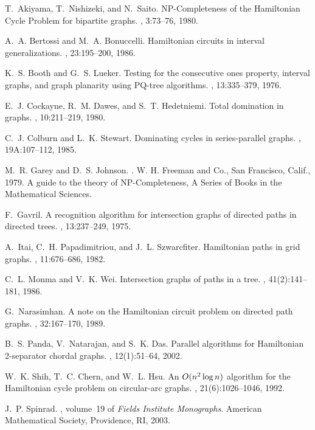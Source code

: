 \documentclass[a4paper,12pt]{article}
\theoremstyle{plain}
\theoremstyle{definition}
\theoremstyle{remark}
\begin{document}
 
\begin{thebibliography}{10}

T.~Akiyama, T.~Nishizeki, and N.~Saito.
\newblock N{P}-{C}ompleteness of the {H}amiltonian {C}ycle {P}roblem for
  bipartite graphs.
, 3:73--76, 1980.

A.~A. Bertossi and M.~A. Bonuccelli.
\newblock Hamiltonian circuits in interval generalizations.
, 23:195--200, 1986.

K.~S. Booth and G.~S. Lueker.
\newblock Testing for the consecutive ones property, interval graphs, and graph
  planarity using {PQ}-tree algorithms.
, 13:335--379, 1976.

E.~J. Cockayne, R.~M. Dawes, and S.~T. Hedetniemi.
\newblock Total domination in graphs.
, 10:211--219, 1980.

C.~J. Colburn and L.~K. Stewart.
\newblock Dominating cycles in series-parallel graphs.
, 19A:107--112, 1985.

M.~R. Garey and D.~S. Johnson.
.
\newblock W. H. Freeman and Co., San Francisco, Calif., 1979.
\newblock A guide to the theory of NP-{C}ompleteness, A Series of Books in the
  Mathematical Sciences.

F.~Gavril.
\newblock A recognition algorithm for intersection graphs of directed paths in
  directed trees.
, 13:237--249, 1975.

A.~Itai, C.~H. Papadimitriou, and J.~L. Szwarcfiter.
\newblock Hamiltonian paths in grid graphs.
, 11:676--686, 1982.

C.~L. Monma and V.~K. Wei.
\newblock Intersection graphs of paths in a tree.
, 41(2):141--181, 1986.

G.~Narasimhan.
\newblock A note on the {H}amiltonian circuit problem on directed path graphs.
, 32:167--170, 1989.

B.~S. Panda, V.~Natarajan, and S.~K. Das.
\newblock Parallel algorithms for {H}amiltonian 2-separator chordal graphs.
, 12(1):51--64, 2002.

W.~K. Shih, T.~C. Chern, and W.~L. Hsu.
\newblock An {$O(n\sp 2\log n)$} algorithm for the {H}amiltonian cycle problem
  on circular-arc graphs.
, 21(6):1026--1046, 1992.

J.~P. Spinrad.
, volume~19 of {\em Fields
  Institute Monographs}.
\newblock American Mathematical Society, Providence, RI, 2003.

\end{thebibliography}
\end{document}
